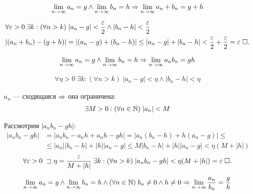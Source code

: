 \documentclass{article}
\begin{document}


\theorem
\begin{align*}
	\lim\limits_{n\to\infty} a_{n}=g\land\lim\limits_{n\to\infty} b_{n}=h\Rightarrow\lim\limits_{n\to\infty} a_n+b_n=g+h
\end{align*}

\proof
\begin{align*}
	 & \forall \varepsilon>0\;\exists k:(\forall n>k)\;|a_{n}-g|<\frac{\varepsilon}{2}\land|b_{n}-h|<\frac{\varepsilon}{2}            \\
	 & |(a_{n}+b_{n})-(g+h)|=|(a_{n}-g)+(b_{n}-h)|\leq|a_{n}-g|+|b_{n}-h|<\frac{\varepsilon}{2}+\frac{\varepsilon}{2}=\varepsilon\;\square.
\end{align*}

\theorem
\begin{align*}
	\lim\limits_{n\to\infty} a_{n}=g\land\lim\limits_{n\to\infty} b_{n}=h\Rightarrow\lim\limits_{n\to\infty} a_n b_n=gh
\end{align*}

\proof
\begin{align*}
	\forall\eta>0\;\exists k:(\forall n>k)\;|a_{n}-g|<\eta\land|b_{n}-h|<\eta
\end{align*}

$a_{n}$ --- сходящаяся $\Rightarrow$ она ограничена:
\begin{align*}
	\exists M>0:(\forall n\in\mathbb{N})\;|a_{n}|<M
\end{align*}

Рассмотрим $|a_{n}b_{n}-gh|$:
\begin{align*}
	|a_{n}b_{n}-gh| & =|a_{n}b_{n}-a_{n}h+a_{n}h-gh|=|a_{n}(b_{n}-h)+h(a_{n}-g)|\leq            \\
	                & \leq|a_{n}||b_{n}-h|+|h||a_{n}-g|\leq M|b_{n}-h|+|h||a_{n}-g|<\eta(M+|h|)
\end{align*}
\begin{align*}
	\forall\varepsilon>0\;\sqsupset\eta=\frac{\varepsilon}{M+|h|}\;\exists k:(\forall n>k)\;|a_{n}b_{n}-gh|<\eta(M+|h|)=\varepsilon\;\square.
\end{align*}

\pagebreak

\theorem
\begin{align*}
	\lim\limits_{n\to\infty} a_{n}=g\land\lim\limits_{n\to\infty} b_{n}=h\land (\forall n\in\mathbb{N})\;b_{n}\neq 0\land h\neq 0\Rightarrow\lim\limits_{n\to\infty}\frac{a_{n}}{b_{n}}=\frac{g}{h}
\end{align*}
\end{document}
